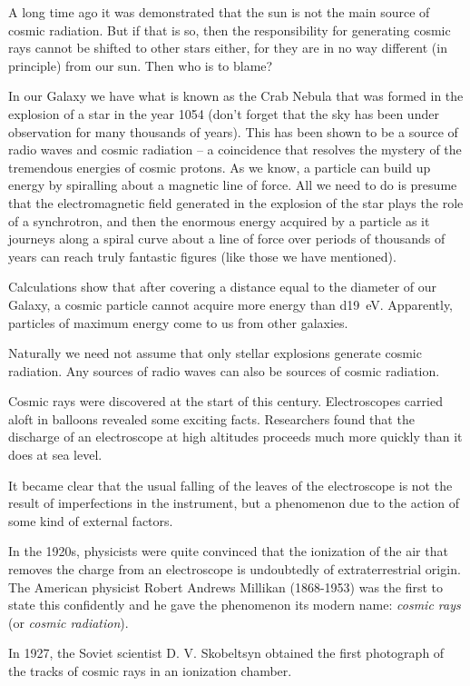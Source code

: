 A long time ago it was demonstrated that the sun is not the main source of cosmic radiation. But if that is so, then the responsibility for generating cosmic rays cannot be shifted to other stars either, for they are in no way different (in principle) from our sun. Then who is to blame?

In our Galaxy we have what is known as the Crab Nebula that was formed in the explosion of a star in the year 1054 (don’t forget that the sky has been under observation for many thousands of years). This has been shown to be a source of radio waves and cosmic radia­tion -- a coincidence that resolves the mystery of the tre­mendous energies of cosmic protons. As we know, a par­ticle can build up energy by spiralling about a magnetic line of force. All we need to do is presume that the elec­tromagnetic field generated in the explosion of the star plays the role of a synchrotron, and then the enormous energy acquired by a particle as it journeys along a spiral curve about a line of force over periods of thousands of years can reach truly fantastic figures (like those we have mentioned).

Calculations show that after covering a distance equal to the diameter of our Galaxy, a cosmic particle cannot acquire more energy than \SI{d19}{\electronvolt}. Apparently, particles of maximum energy come to us from other galaxies.

Naturally we need not assume that only stellar explo­sions generate cosmic radiation. Any sources of radio waves can also be sources of cosmic radiation.

Cosmic rays were discovered at the start of this century. Electroscopes carried aloft in balloons revealed some exciting facts. Researchers found that the discharge of an electroscope at high altitudes proceeds much more quick­ly than it does at sea level.

It became clear that the usual falling of the leaves of the electroscope is not the result of imperfections in the instrument, but a phenomenon due to the action of some kind of external factors.

In the 1920s, physicists were quite convinced that the ionization of the air that removes the charge from an electroscope is undoubtedly of extraterrestrial origin. The American physicist Robert Andrews Millikan (1868-1953) was the first to state this confidently and he gave the phenomenon its modern name: \emph{cosmic rays} (or \emph{cosmic radiation}).

In 1927, the Soviet scientist D. V. Skobeltsyn obtained the first photograph of the tracks of cosmic rays in an ionization chamber.

